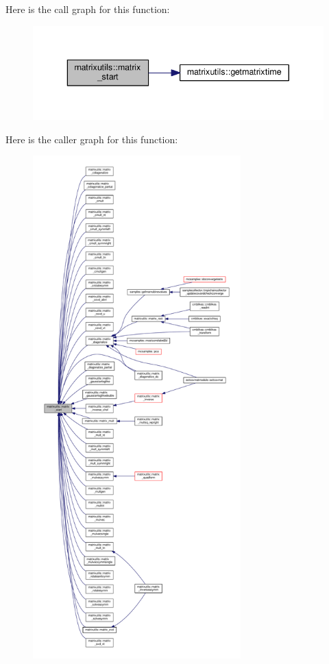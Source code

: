 Here is the call graph for this function\+:
\nopagebreak
\begin{figure}[H]
\begin{center}
\leavevmode
\includegraphics[width=340pt]{namespacematrixutils_a24fd4fc8dbd7eee3c9176c3f9ca634eb_cgraph}
\end{center}
\end{figure}
Here is the caller graph for this function\+:
\nopagebreak
\begin{figure}[H]
\begin{center}
\leavevmode
\includegraphics[height=550pt]{namespacematrixutils_a24fd4fc8dbd7eee3c9176c3f9ca634eb_icgraph}
\end{center}
\end{figure}
\mbox{\label{namespacematrixutils_a7960d8813f71cc715ba85ffba471dd38}} 

